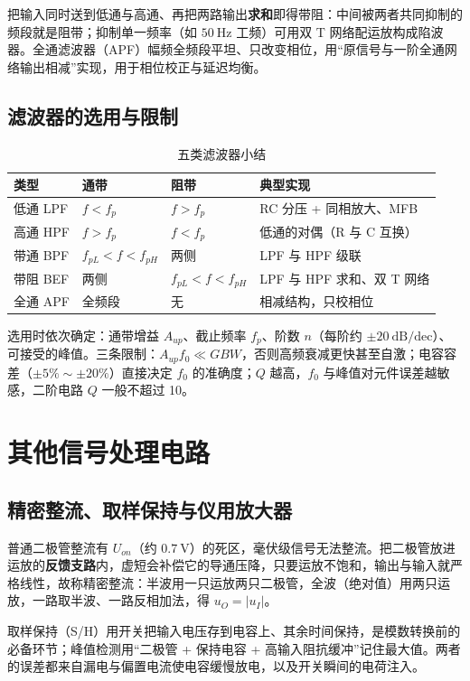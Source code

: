 把输入同时送到低通与高通、再把两路输出\textbf{求和}即得带阻：中间被两者共同抑制的频段就是阻带；抑制单一频率（如 $50\ \mathrm{Hz}$ 工频）可用双 T 网络配运放构成陷波器。全通滤波器（APF）幅频全频段平坦、只改变相位，用“原信号与一阶全通网络输出相减”实现，用于相位校正与延迟均衡。

\subsection{滤波器的选用与限制}
\begin{table}[htbp]
\centering
\caption{五类滤波器小结}
\begin{tabular}{@{}llll@{}}
\hline
类型 & 通带 & 阻带 & 典型实现 \\
\hline
低通 LPF & $f<f_p$ & $f>f_p$ & RC 分压 + 同相放大、MFB \\
高通 HPF & $f>f_p$ & $f<f_p$ & 低通的对偶（R 与 C 互换）\\
带通 BPF & $f_{pL}<f<f_{pH}$ & 两侧 & LPF 与 HPF 级联 \\
带阻 BEF & 两侧 & $f_{pL}<f<f_{pH}$ & LPF 与 HPF 求和、双 T 网络 \\
全通 APF & 全频段 & 无 & 相减结构，只校相位 \\
\hline
\end{tabular}
\end{table}

选用时依次确定：通带增益 $A_{up}$、截止频率 $f_p$、阶数 $n$（每阶约 $\pm20\ \mathrm{dB/dec}$）、可接受的峰值。三条限制：$A_{up}f_0\ll GBW$，否则高频衰减更快甚至自激；电容容差（$\pm5\%\sim\pm20\%$）直接决定 $f_0$ 的准确度；$Q$ 越高，$f_0$ 与峰值对元件误差越敏感，二阶电路 $Q$ 一般不超过 10。

\section{其他信号处理电路}
\subsection{精密整流、取样保持与仪用放大器}
普通二极管整流有 $U_{on}$（约 $0.7\ \mathrm{V}$）的死区，毫伏级信号无法整流。把二极管放进运放的\textbf{反馈支路}内，虚短会补偿它的导通压降，只要运放不饱和，输出与输入就严格线性，故称精密整流：半波用一只运放两只二极管，全波（绝对值）用两只运放，一路取半波、一路反相加法，得 $u_O=|u_I|$。

取样保持（S/H）用开关把输入电压存到电容上、其余时间保持，是模数转换前的必备环节；峰值检测用“二极管 + 保持电容 + 高输入阻抗缓冲”记住最大值。两者的误差都来自漏电与偏置电流使电容缓慢放电，以及开关瞬间的电荷注入。

